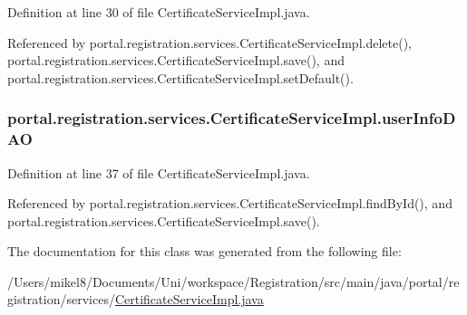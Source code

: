 Definition at line 30 of file CertificateServiceImpl.java.



Referenced by portal.registration.services.CertificateServiceImpl.delete(), portal.registration.services.CertificateServiceImpl.save(), and portal.registration.services.CertificateServiceImpl.setDefault().

\hypertarget{classportal_1_1registration_1_1services_1_1CertificateServiceImpl_aceeb91e757fb23300d5f1e6444ab1534}{
\subsubsection[{userInfoDAO}]{ {\bf portal.registration.services.CertificateServiceImpl.userInfoDAO}}}
\label{classportal_1_1registration_1_1services_1_1CertificateServiceImpl_aceeb91e757fb23300d5f1e6444ab1534}


Definition at line 37 of file CertificateServiceImpl.java.



Referenced by portal.registration.services.CertificateServiceImpl.findById(), and portal.registration.services.CertificateServiceImpl.save().



The documentation for this class was generated from the following file:\begin{DoxyCompactItemize}
\item 
/Users/mikel8/Documents/Uni/workspace/Registration/src/main/java/portal/registration/services/\hyperlink{CertificateServiceImpl_8java}{CertificateServiceImpl.java}\end{DoxyCompactItemize}
